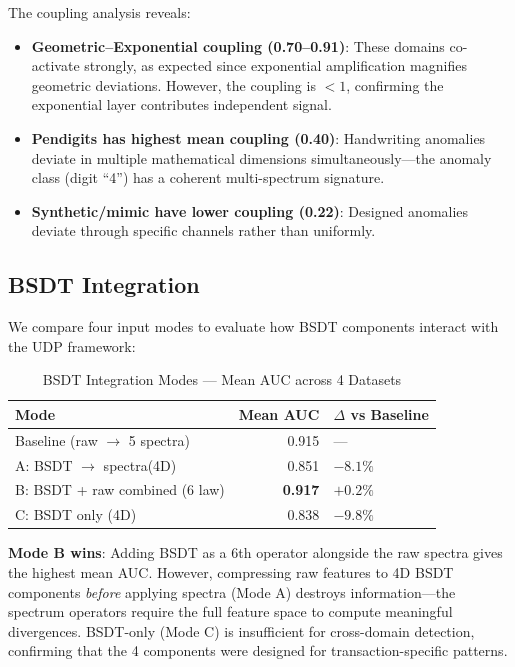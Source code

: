 \documentclass[journal]{IEEEtran}
\begin{document}
The coupling analysis reveals:
\begin{itemize}
  \item \textbf{Geometric--Exponential coupling (0.70--0.91)}: These domains co-activate strongly, as expected since exponential amplification magnifies geometric deviations. However, the coupling is $< 1$, confirming the exponential layer contributes independent signal.
  \item \textbf{Pendigits has highest mean coupling (0.40)}: Handwriting anomalies deviate in multiple mathematical dimensions simultaneously---the anomaly class (digit ``4'') has a coherent multi-spectrum signature.
  \item \textbf{Synthetic/mimic have lower coupling (0.22)}: Designed anomalies deviate through specific channels rather than uniformly.
\end{itemize}

\subsection{BSDT Integration}
\label{ssec:bsdt_integration}

We compare four input modes to evaluate how BSDT components interact with the UDP framework:

\begin{table}[!t]
\centering
\caption{BSDT Integration Modes --- Mean AUC across 4 Datasets}
\label{tab:modes}
\begin{tabular}{@{}lrl@{}}
\toprule
\textbf{Mode} & \textbf{Mean AUC} & \textbf{$\Delta$ vs Baseline} \\
\midrule
Baseline (raw $\to$ 5 spectra) & 0.915 & --- \\
A: BSDT $\to$ spectra(4D) & 0.851 & $-8.1\%$ \\
B: BSDT + raw combined (6 law) & \textbf{0.917} & $+0.2\%$ \\
C: BSDT only (4D) & 0.838 & $-9.8\%$ \\
\bottomrule
\end{tabular}
\end{table}

\textbf{Mode B wins}: Adding BSDT as a 6th operator alongside the raw spectra gives the highest mean AUC. However, compressing raw features to 4D BSDT components \textit{before} applying spectra (Mode A) destroys information---the spectrum operators require the full feature space to compute meaningful divergences. BSDT-only (Mode C) is insufficient for cross-domain detection, confirming that the 4 components were designed for transaction-specific patterns.
\end{document}
